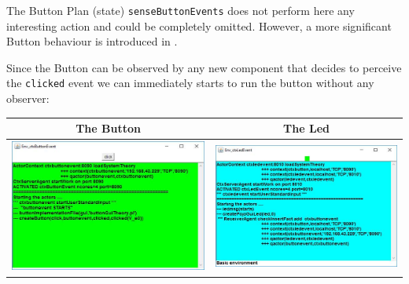 

The Button Plan (state) \texttt{senseButtonEvents} does not perform here any interesting action and could be completely omitted. However, a more significant Button behaviour is introduced in .

Since the Button can be observed by any new component that decides to perceive the \texttt{clicked} event we can immediately starts to run the button without any observer:

\begin{tabular}{|c|c|}
\hline 
The Button & The Led \\ 
\hline 
\includegraphics[scale = 0.4]{./img/buttonEventGui.jpg}
  &  \includegraphics[scale = 0.40]{./img/ledEventGui.jpg} \\
\hline 
\end{tabular} 
